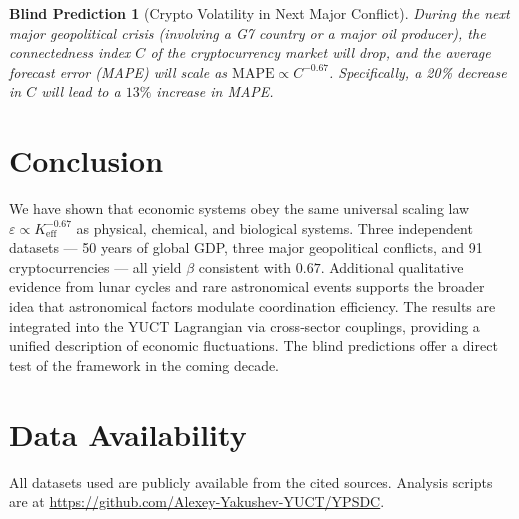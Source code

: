 \documentclass[11pt,a4paper]{article}
\newcommand{\Keff}{K_{\mathrm{eff}}}
\newtheorem{prediction}[theorem]{Blind Prediction}
\theoremstyle{remark}
\begin{document}
	\begin{prediction}[Crypto Volatility in Next Major Conflict]
		During the next major geopolitical crisis (involving a G7 country or a major oil producer), the connectedness index $C$ of the cryptocurrency market will drop, and the average forecast error (MAPE) will scale as $\text{MAPE} \propto C^{-0.67}$. Specifically, a 20\% decrease in $C$ will lead to a $13\%$ increase in MAPE.
	\end{prediction}
	
	\section{Conclusion}
	\label{sec:conclusion}
	
	We have shown that economic systems obey the same universal scaling law $\varepsilon \propto \Keff^{-0.67}$ as physical, chemical, and biological systems. Three independent datasets — 50 years of global GDP, three major geopolitical conflicts, and 91 cryptocurrencies — all yield $\beta$ consistent with $0.67$. Additional qualitative evidence from lunar cycles and rare astronomical events supports the broader idea that astronomical factors modulate coordination efficiency. The results are integrated into the YUCT Lagrangian via cross‑sector couplings, providing a unified description of economic fluctuations. The blind predictions offer a direct test of the framework in the coming decade.
	
	\section*{Data Availability}
	
	All datasets used are publicly available from the cited sources. Analysis scripts are at \url{https://github.com/Alexey-Yakushev-YUCT/YPSDC}.
	
\end{document}
